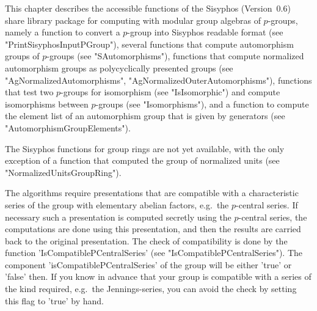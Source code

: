 \def\SISYPHOS{\sc Sisyphos}

This chapter describes the {\GAP} accessible functions of the {\SISYPHOS}
(Version~0.6) share library package for computing with modular group
algebras of $p$-groups,
namely a function to convert a $p$-group into {\SISYPHOS}
readable format (see "PrintSisyphosInputPGroup"), several functions that
compute automorphism groups of $p$-groups (see "SAutomorphisms"),
functions that compute normalized
automorphism groups as polycyclically presented groups
(see "AgNormalizedAutomorphisms", "AgNormalizedOuterAutomorphisms"),
functions that test two $p$-groups for isomorphism (see "IsIsomorphic")
and compute isomorphisms between $p$-groups (see "Isomorphisms"),
and a function to compute the element list of an automorphism group that
is given by generators (see "AutomorphismGroupElements").

The {\SISYPHOS} functions for group rings are not yet available, with
the only exception of a function that computed the group of normalized
units (see "NormalizedUnitsGroupRing").

The algorithms require presentations that are compatible with a 
characteristic series of the group with elementary abelian factors, e.g.\ 
the $p$-central series.
If necessary such a presentation is computed secretly using the 
$p$-central series, the
computations are done using this presentation, and then the results are
carried back to the original presentation.  The check of compatibility
is done by the function 'IsCompatiblePCentralSeries' (see 
"IsCompatiblePCentralSeries").
The component 'isCompatiblePCentralSeries' of the group will be either 'true'
or 'false' then.
If you know in advance that your group is compatible with a series of the 
kind required, e.g.\ the Jennings-series, 
you can avoid the check by setting this flag to 'true' by hand.

